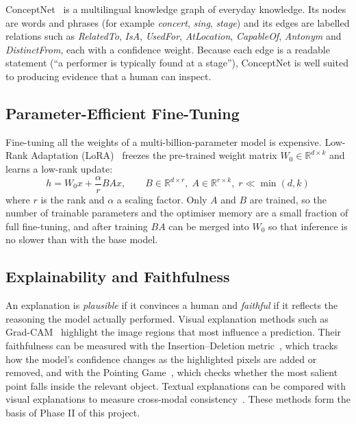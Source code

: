 \documentclass[12pt,a4paper,oneside]{report}
\begin{document}
ConceptNet~\cite{speer2017conceptnet} is a multilingual knowledge graph of
everyday knowledge. Its nodes are words and phrases (for example
\emph{concert}, \emph{sing}, \emph{stage}) and its edges are labelled
relations such as \emph{RelatedTo}, \emph{IsA}, \emph{UsedFor},
\emph{AtLocation}, \emph{CapableOf}, \emph{Antonym} and \emph{DistinctFrom},
each with a confidence weight. Because each edge is a readable statement
(``a performer is typically found at a stage''), ConceptNet is well suited to
producing evidence that a human can inspect.

\subsection{Parameter-Efficient Fine-Tuning}

Fine-tuning all the weights of a multi-billion-parameter model is expensive.
Low-Rank Adaptation (LoRA)~\cite{hu2022lora} freezes the pre-trained weight
matrix $W_0 \in \mathbb{R}^{d \times k}$ and learns a low-rank update:
\begin{equation}
  h = W_0 x + \frac{\alpha}{r} B A x, \qquad
  B \in \mathbb{R}^{d \times r},\; A \in \mathbb{R}^{r \times k},\; r \ll \min(d,k)
  \label{eq:lora}
\end{equation}
where $r$ is the rank and $\alpha$ a scaling factor. Only $A$ and $B$ are
trained, so the number of trainable parameters and the optimiser memory are a
small fraction of full fine-tuning, and after training $BA$ can be merged into
$W_0$ so that inference is no slower than with the base model.

\subsection{Explainability and Faithfulness}

An explanation is \emph{plausible} if it convinces a human and \emph{faithful}
if it reflects the reasoning the model actually performed. Visual explanation
methods such as Grad-CAM~\cite{selvaraju2017gradcam} highlight the image
regions that most influence a prediction. Their faithfulness can be measured
with the Insertion--Deletion metric~\cite{petsiuk2018rise}, which tracks how the
model's confidence changes as the highlighted pixels are added or removed, and
with the Pointing Game~\cite{zhang2018excitation}, which checks whether the most
salient point falls inside the relevant object. Textual explanations can be
compared with visual explanations to measure cross-modal
consistency~\cite{zhang2024crossmodal,parcalabescu2025faithfulness}. These
methods form the basis of Phase II of this project.
\end{document}
